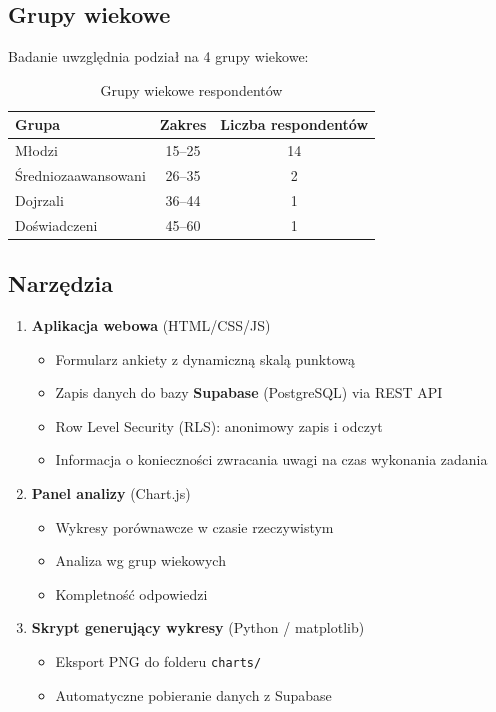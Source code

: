 \documentclass[12pt,a4paper]{article}
\begin{document}
\subsection{Grupy wiekowe}

Badanie uwzględnia podział na 4 grupy wiekowe:

\begin{table}[H]
\centering
\caption{Grupy wiekowe respondentów}
\label{tab:grupy_wiekowe}
\begin{tabular}{|l|c|c|}
\hline
\textbf{Grupa} & \textbf{Zakres} & \textbf{Liczba respondentów} \\
\hline
Młodzi & 15--25 & 14 \\
\hline
Średniozaawansowani & 26--35 & 2 \\
\hline
Dojrzali & 36--44 & 1 \\
\hline
Doświadczeni & 45--60 & 1 \\
\hline
\end{tabular}
\end{table}

\subsection{Narzędzia}

\begin{enumerate}[noitemsep]
    \item \textbf{Aplikacja webowa} (HTML/CSS/JS)
    \begin{itemize}[noitemsep]
        \item Formularz ankiety z dynamiczną skalą punktową
        \item Zapis danych do bazy \textbf{Supabase} (PostgreSQL) via REST API
        \item Row Level Security (RLS): anonimowy zapis i odczyt
        \item Informacja o konieczności zwracania uwagi na czas wykonania zadania
    \end{itemize}

    \item \textbf{Panel analizy} (Chart.js)
    \begin{itemize}[noitemsep]
        \item Wykresy porównawcze w czasie rzeczywistym
        \item Analiza wg grup wiekowych
        \item Kompletność odpowiedzi
    \end{itemize}

    \item \textbf{Skrypt generujący wykresy} (Python / matplotlib)
    \begin{itemize}[noitemsep]
        \item Eksport PNG do folderu \texttt{charts/}
        \item Automatyczne pobieranie danych z Supabase
    \end{itemize}
\end{enumerate}
\end{document}
